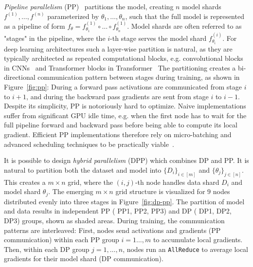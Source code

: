 \documentclass{article}
\begin{document}
\textit{Pipeline parallelism} (PP)~\cite{huang2019gpipe} partitions the model,
creating $n$ model shards $f^{(1)},\dots,f^{(n)}$ parameterized by
$\theta_1,\dots,\theta_n$, such that the full model is represented as a pipeline
of form $f_{\theta}=f^{(1)}_{\theta_1}\circ\dots\circ f^{(1)}_{\theta_n}$. Model
shards are often referred to as "stages" in the pipeline, where the $i$-th stage
serves the model shard $f^{(i)}_{\theta_i}$.  For deep learning architectures
such a layer-wise partition is natural, as they are typically architected as
repeated computational blocks, e.g. convolutional blocks in
CNNs~\cite{krizhevsky2012alexnet} and Transformer blocks in
Transformer~\cite{vaswani2017transformer} The partitioning creates a
bi-directional communication pattern between stages during training, as shown in
Figure~\ref{fig:pp}: During a forward pass activations are communicated from
stage $i$ to $i+1$, and during the backward pass gradients are sent from stage
$i$ to $i-1$. Despite its simplicity, PP is notoriously hard to optimize. Naive
implementations suffer from significant GPU idle time, e.g. when the first node
has to wait for the full pipeline forward and backward pass before being able to
compute its local gradient. Efficient PP implementations therefore rely on
micro-batching and advanced scheduling techniques to be practically
viable~\cite{harlap2018pipedream, huang2019gpipe}. 


It is possible to design \textit{hybrid parallelism} (DPP) which combines DP and
PP. It is natural to partition both the dataset and model into $\{D_i\}_{i\in
[m]}$ and $\{\theta_j\}_{j\in [n]}$. This creates a $m\times n$ grid, where the
$(i,j)$-th node handles data shard $D_i$ and model shard $\theta_j$. The
emerging $m\times n$ grid structure is visualized for $9$ nodes distributed
evenly into three stages in Figure~\ref{fig:dp-pp}. The partition of model and
data results in independent PP ({\color{oorange} PP1, PP2, PP3}) and DP
({\color{bblue} DP1, DP2, DP3}) groups, shown as shaded areas. During training,
the communication patterns are interleaved: First, nodes send activations and
gradients (PP communication) within each PP group $i=1\dots,m$ to accumulate
local gradients. Then, within each DP group $j=1,\dots,n$, nodes run an
\texttt{AllReduce} to average local gradients for their model shard (DP
communication). 
\end{document}
